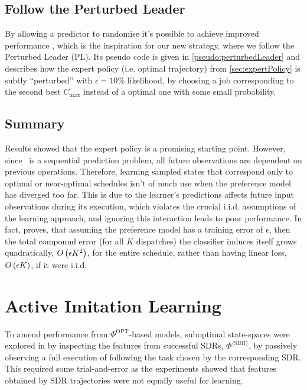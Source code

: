\subsection{Follow the Perturbed Leader}\label{sec:perturbedLeader}
By allowing a predictor to randomise it's possible to achieve improved 
performance \cite{CesaBianchi06,Hannan57}, which is the inspiration for our new 
strategy, where we follow the Perturbed Leader (PL). 
Its pseudo code is given in \cref{pseudo:perturbedLeader} and describes how the 
expert policy (i.e. optimal trajectory) from \cref{sec:expertPolicy} is subtly
``perturbed'' with $\epsilon=10\%$ likelihood, by choosing a job corresponding 
to the second best $C_{\max}$ instead of a optimal one with some small 
probability. 



\subsection{Summary}

Results showed that the expert policy is a promising starting point. 
However, since \jsp\ is a sequential prediction problem, all future 
observations are dependent on previous operations. 
Therefore, learning sampled states that correspond only to optimal or 
near-optimal schedules isn't of much use when the preference model has 
diverged too far. 
This is due to the learner's predictions affects future input observations 
during its execution, which violates the crucial i.i.d. assumptions of the  
learning approach, and ignoring this interaction leads to poor performance.
In fact, \cite{RossB10} proves, that assuming the preference model has a 
training error of $\epsilon$, then the total compound error (for all $K$ 
dispatches) the classifier induces itself grows quadratically, ${O}\left(\epsilon 
    K^2\right)$, for the entire schedule, rather than having linear loss, 
${O}\left(\epsilon K\right)$, if it were i.i.d.


\section{Active Imitation Learning}\label{sec:il:active}

To amend performance from $\Phi^{\text{OPT}}$-based models, suboptimal 
state-spaces were explored in \cite{InRu15a} by inspecting the features from 
successful SDRs, $\Phi^{\langle\text{SDR}\rangle}$, by passively observing a 
full execution of following the task chosen by the corresponding SDR. 
This required some trial-and-error as the experiments showed that features 
obtained by SDR trajectories were not equally useful for learning.



